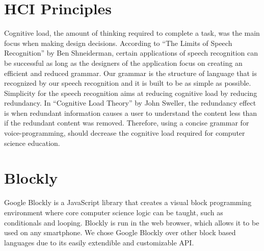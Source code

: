 \documentclass[]{article}
\begin{document}
\section{HCI Principles}
Cognitive load, the amount of thinking required to complete a task, was the main focus when making design decisions. 
According to ``The Limits of Speech Recognition'' by Ben Shneiderman, certain applications of speech recognition can be successful as long as the designers of the application focus on creating an efficient and reduced grammar.
Our grammar is the structure of language that is recognized by our speech recognition and it is built to be as simple as possible. 
Simplicity for the speech recognition aims at reducing cognitive load by reducing redundancy. 
In ``Cognitive Load Theory'' by John Sweller, the redundancy effect is when redundant information causes a user to understand the content
less than if the redundant content was removed. 
Therefore, using a concise grammar for voice-programming, should decrease the cognitive load required for computer science education.

\section{Blockly}
Google Blockly is a JavaScript library that creates a visual block programming environment where core computer science logic can be taught, such as conditionals and looping. 
Blockly is run in the web browser, which allows it to be used on any smartphone. 
We chose Google Blockly over other block based languages due to its easily extendible and customizable API.
\end{document}
